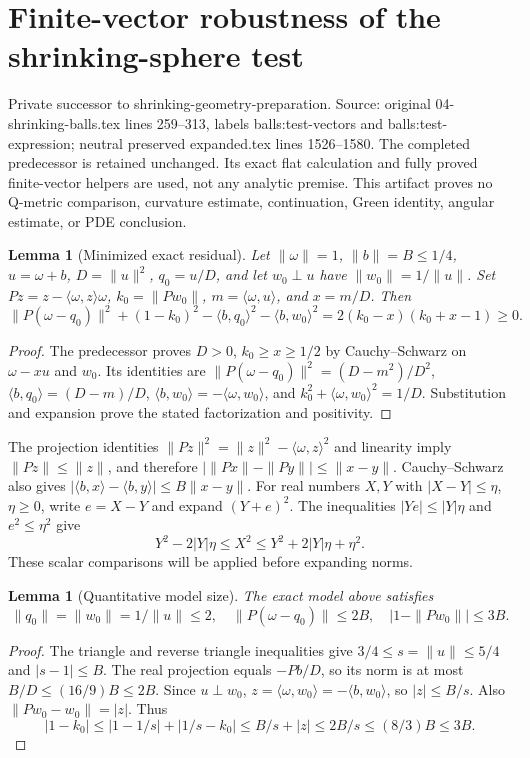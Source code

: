 \documentclass[11pt]{article}
\newtheorem{lemma}[theorem]{Lemma}
\theoremstyle{definition}
\theoremstyle{remark}
\numberwithin{equation}{section}
\begin{document}
\clearpage
\section{Finite-vector robustness of the shrinking-sphere test}


Private successor to shrinking-geometry-preparation. Source: original
04-shrinking-balls.tex lines 259--313, labels balls:test-vectors and
balls:test-expression; neutral preserved expanded.tex lines 1526--1580.
The completed predecessor is retained unchanged. Its exact flat calculation
and fully proved finite-vector helpers are used, not any analytic premise.
This artifact proves no Q-metric comparison, curvature estimate, continuation,
Green identity, angular estimate, or PDE conclusion.

\begin{lemma}[Minimized exact residual]
Let $\|\omega\|=1$, $\|b\|=B\le1/4$, $u=\omega+b$,
$D=\|u\|^2$, $q_0=u/D$, and let $w_0\perp u$ have
$\|w_0\|=1/\|u\|$. Set $Pz=z-\langle\omega,z\rangle\omega$,
$k_0=\|Pw_0\|$, $m=\langle\omega,u\rangle$, and $x=m/D$.
Then
\[
 \|P(\omega-q_0)\|^2+(1-k_0)^2
       -\langle b,q_0\rangle^2-\langle b,w_0\rangle^2
 =2(k_0-x)(k_0+x-1)\ge0.
\]
\end{lemma}
\begin{proof}
The predecessor proves $D>0$, $k_0\ge x\ge1/2$ by
Cauchy--Schwarz on $\omega-xu$ and $w_0$. Its identities are
$\|P(\omega-q_0)\|^2=(D-m^2)/D^2$,
$\langle b,q_0\rangle=(D-m)/D$,
$\langle b,w_0\rangle=-\langle\omega,w_0\rangle$, and
$k_0^2+\langle\omega,w_0\rangle^2=1/D$. Substitution and expansion
prove the stated factorization and positivity.
\end{proof}

The projection identities $\|Pz\|^2=\|z\|^2-\langle\omega,z\rangle^2$
and linearity imply $\|Pz\|\le\|z\|$, and therefore
$|\|Px\|-\|Py\||\le\|x-y\|$.  Cauchy--Schwarz also gives
$|\langle b,x\rangle-\langle b,y\rangle|\le B\|x-y\|$.
For real numbers $X,Y$ with $|X-Y|\le\eta$, $\eta\ge0$, write
$e=X-Y$ and expand $(Y+e)^2$. The inequalities
$|Ye|\le|Y|\eta$ and $e^2\le\eta^2$ give
\[
 Y^2-2|Y|\eta\le X^2\le Y^2+2|Y|\eta+\eta^2.
\]
These scalar comparisons will be applied before expanding norms.

\begin{lemma}[Quantitative model size]
The exact model above satisfies
\[
 \|q_0\|=\|w_0\|=1/\|u\|\le2,\quad
 \|P(\omega-q_0)\|\le2B,\quad |1-\|Pw_0\||\le3B.
\]
\end{lemma}
\begin{proof}
The triangle and reverse triangle inequalities give
$3/4\le s=\|u\|\le5/4$ and $|s-1|\le B$.
The real projection equals $-Pb/D$, so its norm is at most
$B/D\le(16/9)B\le2B$.  Since $u\perp w_0$,
$z=\langle\omega,w_0\rangle=-\langle b,w_0\rangle$,
so $|z|\le B/s$. Also $\|Pw_0-w_0\|=|z|$.
Thus
\[
 |1-k_0|\le|1-1/s|+|1/s-k_0|
 \le B/s+|z|\le2B/s\le(8/3)B\le3B.
\]
\end{proof}
\end{document}
